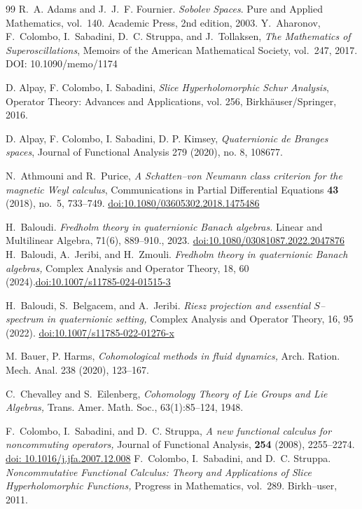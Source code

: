 \documentclass[10pt]{amsart}
\numberwithin{equation}{section}
\theoremstyle{remark}
\theoremstyle{definition}
\begin{document}
\begin{thebibliography}{99}
R.~A. Adams and J.~J.~F. Fournier.
 \emph{Sobolev Spaces}.
 Pure and Applied Mathematics, vol.~140. Academic Press, 2nd edition, 2003.
Y.~Aharonov, F.~Colombo, I.~Sabadini, D.~C. Struppa, and J.~Tollaksen,
 \emph{The Mathematics of Superoscillations},
 Memoirs of the American Mathematical Society, vol.~247, 2017. DOI: 10.1090/memo/1174

D. Alpay, F. Colombo, I. Sabadini, \emph{Slice Hyperholomorphic Schur Analysis}, Operator Theory: Advances and Applications, vol. 256, Birkh\"auser/Springer, 2016.

D. Alpay, F. Colombo, I. Sabadini, D. P. Kimsey, \emph{Quaternionic de Branges spaces}, Journal of Functional Analysis 279 (2020), no. 8, 108677.

N.~Athmouni and R.~Purice,
\emph{A Schatten--von Neumann class criterion for the magnetic Weyl calculus},
Communications in Partial Differential Equations \textbf{43} (2018), no.~5, 733--749.
\href{https://doi.org/10.1080/03605302.2018.1475486}{doi:10.1080/03605302.2018.1475486}

H.~Baloudi.
\emph{Fredholm theory in quaternionic Banach algebras.}
Linear and Multilinear Algebra, 71(6), 889--910., 2023. \href{https://doi.org/10.1080/03081087.2022.2047876}{doi:10.1080/03081087.2022.2047876}
H.~Baloudi, A.~Jeribi, and H.~Zmouli.
\emph{Fredholm theory in quaternionic Banach algebras,}
  Complex Analysis and Operator Theory, 18, 60 (2024).\href{ https://doi.org/10.1007/s11785-024-01515-3}{doi:10.1007/s11785-024-01515-3}

H.~Baloudi, S.~Belgacem, and A.~Jeribi.
\emph{ Riesz projection and essential $S$--spectrum in quaternionic setting,}
Complex Analysis and Operator Theory,  16, 95 (2022). \href{https://doi.org/10.1007/s11785-022-01276-x}
{doi:10.1007/s11785-022-01276-x}

 M. Bauer, P. Harms, \emph{Cohomological methods in fluid dynamics,} Arch. Ration. Mech. Anal. 238 (2020), 123–167.


C.~Chevalley and S.~Eilenberg,
\emph{Cohomology Theory of Lie Groups and Lie Algebras,}
Trans. Amer. Math. Soc., 63(1):85--124, 1948.

F.~Colombo, I.~Sabadini, and D.~C. Struppa,
\emph{A new functional calculus for noncommuting operators,}
Journal of Functional Analysis, \textbf{254} (2008), 2255--2274. \href{https://doi.org/10.1016/j.jfa.2007.12.00} {doi: 10.1016/j.jfa.2007.12.008}
F.~Colombo, I.~Sabadini, and D.~C. Struppa.
\emph{ Noncommutative Functional Calculus: Theory and Applications of Slice Hyperholomorphic Functions,}
 Progress in Mathematics, vol.~289. Birkh--user, 2011.




\end{thebibliography}
\end{document}
